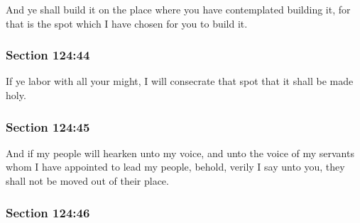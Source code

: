 		And ye shall build it on the place where you have contemplated building it, for that is the spot which I have chosen for you to build it.


	\subsubsection{Section 124:44} %
		\label{DC124-44}

		If ye labor with all your might, I will consecrate that spot that it shall be made holy.


	\subsubsection{Section 124:45} %
		\label{DC124-45}

		And if my people will hearken unto my voice, and unto the voice of my servants whom I have appointed to lead my people, behold, verily I say unto you, they shall not be moved out of their place.


	\subsubsection{Section 124:46} %
		\label{DC124-46}

